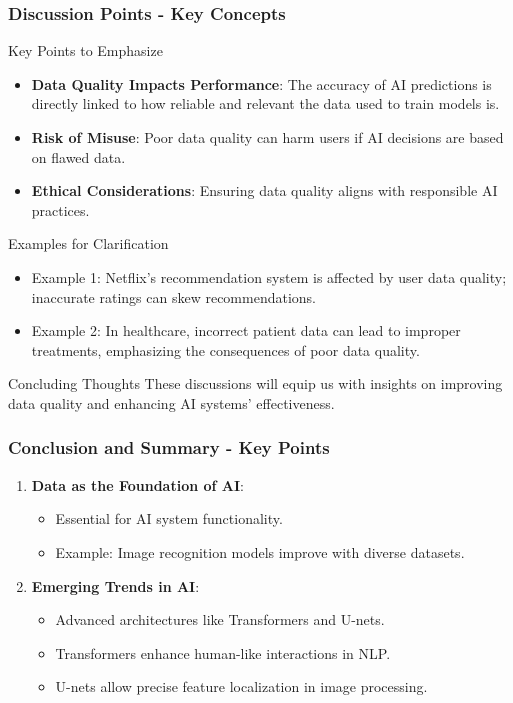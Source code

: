 \documentclass[aspectratio=169]{beamer}
\begin{document}
\begin{frame}[fragile]
    \frametitle{Discussion Points - Key Concepts}
    \begin{block}{Key Points to Emphasize}
        \begin{itemize}
            \item \textbf{Data Quality Impacts Performance}: The accuracy of AI predictions is directly linked to how reliable and relevant the data used to train models is.
            \item \textbf{Risk of Misuse}: Poor data quality can harm users if AI decisions are based on flawed data.
            \item \textbf{Ethical Considerations}: Ensuring data quality aligns with responsible AI practices.
        \end{itemize}
    \end{block}

    \begin{block}{Examples for Clarification}
        \begin{itemize}
            \item Example 1: Netflix’s recommendation system is affected by user data quality; inaccurate ratings can skew recommendations.
            \item Example 2: In healthcare, incorrect patient data can lead to improper treatments, emphasizing the consequences of poor data quality.
        \end{itemize}
    \end{block}
    
    \begin{block}{Concluding Thoughts}
        These discussions will equip us with insights on improving data quality and enhancing AI systems' effectiveness.
    \end{block}
\end{frame}

\begin{frame}[fragile]
    \frametitle{Conclusion and Summary - Key Points}
    \begin{enumerate}
        \item \textbf{Data as the Foundation of AI}:
        \begin{itemize}
            \item Essential for AI system functionality.
            \item Example: Image recognition models improve with diverse datasets.
        \end{itemize}
        
        \item \textbf{Emerging Trends in AI}:
        \begin{itemize}
            \item Advanced architectures like Transformers and U-nets.
            \item Transformers enhance human-like interactions in NLP.
            \item U-nets allow precise feature localization in image processing.
        \end{itemize}
    \end{enumerate}
\end{frame}
\end{document}
